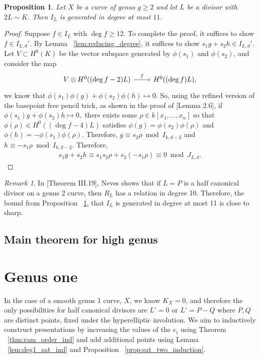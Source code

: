 \documentclass{amsart}
\theoremstyle{plain}
\newtheorem{prop}[thm]{Proposition}
\theoremstyle{definition}
\theoremstyle{remark}
\newtheorem{rem}[thm]{Remark}
\numberwithin{equation}{section}
\newcommand\ssec{\subsection}
\newcommand \halfcan{L}
\begin{document}
\begin{prop}
\label{prop:relations_generation}
Let $X$ be a curve of genus $g \geq 2$ and let $L$ be a divisor with $2L \sim K$. Then $I_L$ is generated in degree at most $11$.
\end{prop}
\begin{proof}
Suppose $f \in I_L$ with $\deg f \geq 12$. To complete the proof, it suffices to show $f \in I_{L,d}'$. By Lemma ~\ref{lem:reducing_degree}, it suffices to show $s_1g+s_2h \in I_{L,d}'$. 
Let $V \subset H^0(K)$ be the vector subspace generated by $\phi(s_1)$ and $\phi(s_2)$, and consider the map
$$\begin{tikzcd}
V \otimes H^0((\deg f - 2)L) \ar {r}{f} & H^0((\deg f)L),
\end{tikzcd}$$
we know that $\phi(s_1)\phi(g) + \phi(s_2) \phi(h) \mapsto 0.$
So, using the refined version of the basepoint free pencil trick, as shown in the proof of \cite{saint-donat:proj}[Lemma 2.6], if $\phi(s_1) g + \phi(s_2)h \mapsto 0,$ there exists some $\rho \in k[x_1, \ldots, x_n]$ so that $\phi(\rho) \in H^0((\deg f - 4)L)$ satisfies $\phi(g) = \phi(s_2)\phi(\rho)$ and $\phi(h) = -\phi(s_1)\phi(\rho).$ Therefore, $g \equiv s_2 \rho \bmod I_{k,d-2}$ and $h \equiv -s_1 \rho \bmod I_{k,d-2}$. Therefore,
\begin{align*}
	s_1g + s_2h \equiv s_1s_2\rho + s_2(-s_1 \rho) \equiv 0 \bmod J_{L,d}.
\end{align*}
\end{proof}

\begin{rem}
\label{rem:relations_generation_ten}
In \cite{neves:halfcan}[Theorem III.19], Neves shows that if $L=P$ is a half canonical divisor on a genus 2 curve, then $R_L$ has a relation in degree 10. Therefore, the bound from Proposition ~\ref{prop:relations_generation}, that $I_L$ is generated in degree at most 11 is close to sharp.
\end{rem}



\ssec{Main theorem for high genus}
\label{ssec:main_g_high}



\section{Genus one}
\label{sec:g_1}

In the case of a smooth genus 1 curve, $X$, we know $K_X = 0$, and therefore the only possibilities for half canonical divisors are $\halfcan' = 0$ or $\halfcan' = P-Q$ where $P,Q$ are distinct points, fixed under the hyperelliptic involution. We aim to inductively construct presentations by increasing the values of the $e_i$ using Theorem ~\ref{thm:ram_order_ind} and add additional points using Lemma ~\ref{lem:deg1_sat_ind} and Proposition ~\ref{prop:sat_two_induction}.
\end{document}

